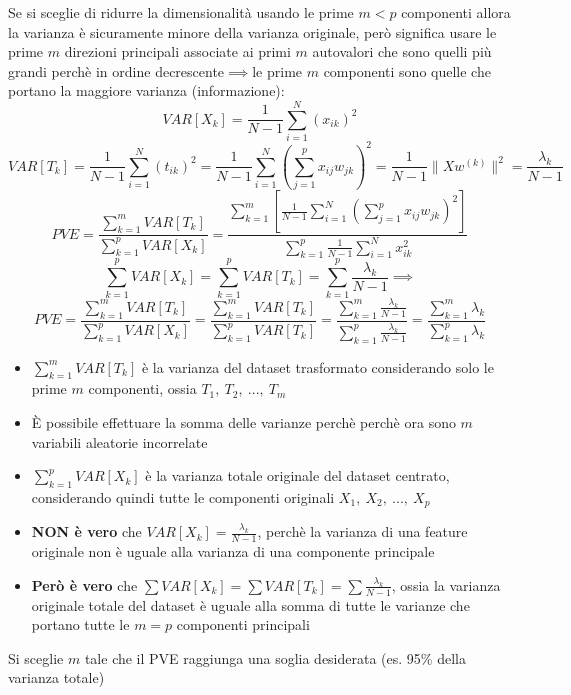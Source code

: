 		\begin{mybox}
			Se si sceglie di ridurre la dimensionalità usando le prime $m<p$ componenti allora la varianza è sicuramente minore della varianza originale, però significa usare le prime $m$ direzioni principali associate ai primi $m$ autovalori che sono quelli più grandi perchè in ordine decrescente$\implies$le prime $m$ componenti sono quelle che portano la maggiore varianza (informazione):
			$$
			VAR[X_k]=\frac{1}{N-1} \sum_{i=1}^{N} (x_{ik})^2
			$$
			$$
			VAR[T_k] = \frac{1}{N-1} \sum_{i=1}^{N} (t_{ik})^2 = \frac{1}{N-1} \sum_{i=1}^{N} \left( \sum_{j=1}^{p} x_{ij} w_{jk} \right)^2=\frac{1}{N-1}\|Xw^{(k)}\|^2=\frac{\lambda_k}{N-1}
			$$
			$$
			PVE = \frac{\displaystyle\sum_{k=1}^{m}VAR[T_k]}{\displaystyle\sum_{k=1}^{p} VAR[X_k]}
			=\frac{\displaystyle\sum_{k=1}^{m} \left[ \frac{1}{N-1} \sum_{i=1}^{N} \left( \sum_{j=1}^{p} x_{ij} w_{jk} \right)^2 \right]}{\displaystyle\sum_{k=1}^{p} \frac{1}{N-1} \sum_{i=1}^{N} x_{ik}^2}
			$$
			$$
			\sum_{k=1}^{p} VAR[X_k] = \sum_{k=1}^{p} VAR[T_k] = \sum_{k=1}^{p} \frac{\lambda_k}{N-1}\implies
			$$
			$$
			PVE = \frac{\displaystyle\sum_{k=1}^{m}VAR[T_k]}{\displaystyle\sum_{k=1}^{p} VAR[X_k]}=\frac{\displaystyle\sum_{k=1}^{m}VAR[T_k]}{\displaystyle\sum_{k=1}^{p} VAR[T_k]}=\frac{\displaystyle\sum_{k=1}^{m}\frac{\lambda_k}{N-1}}{\displaystyle\sum_{k=1}^{p} \frac{\lambda_k}{N-1}}=
			\boxed{\frac{\displaystyle\sum_{k=1}^{m}\lambda_k}{\displaystyle\sum_{k=1}^{p} \lambda_k}}
			$$
			
			\begin{itemize}[itemsep=3pt, topsep=3pt]
			  \item $\sum_{k=1}^{m}VAR[T_k]$ è la varianza del dataset trasformato considerando solo le prime $m$ componenti, ossia $T_1,\ T_2,\ ...,\ T_m$
			  \item È possibile effettuare la somma delle varianze perchè perchè ora sono $m$ variabili aleatorie incorrelate
			  \item $\sum_{k=1}^{p} VAR[X_k]$ è la varianza totale originale del dataset centrato, considerando quindi tutte le componenti originali $X_1,\ X_2,\ ...,\ X_p$
			  \item \textbf{NON è vero} che $VAR[X_k] = \frac{\lambda_k}{N-1}$, perchè la varianza di una feature originale non è uguale alla varianza di una componente principale
			  \item \textbf{Però è vero} che $\sum VAR[X_k] = \sum VAR[T_k] =\sum \frac{\lambda_k}{N-1}$, ossia la varianza originale totale del dataset è uguale alla somma di tutte le varianze che portano tutte le $m=p$ componenti principali
			\end{itemize}
			
			Si sceglie $m$ tale che il PVE raggiunga una soglia desiderata (es. 95\% della varianza totale)
		\end{mybox}
		
